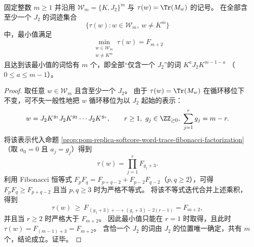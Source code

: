 \begin{corollary}[词迹底数的最小值与精确重数]\label{cor:pom-replica-softcore-word-trace-minimal-base-multiplicity}
固定整数 \(m\ge 1\) 并沿用 \(\mathcal W_m=\{K,J_2\}^m\) 与 \(\tau(w)=\Tr(M_w)\) 的记号。
在全部含至少一个 \(J_2\) 的词迹集合
\[
\bigl\{\tau(w):w\in\mathcal W_m,\ w\neq K^m\bigr\}
\]
中，最小值满足
\[
\boxed{\ \min_{\substack{w\in\mathcal W_m\\ w\neq K^m}}\tau(w)=F_{m+2}\ }
\]
且达到该最小值的词恰有 \(m\) 个，即全部“仅含一个 \(J_2\)”的词
\(
K^{a}J_2K^{m-1-a}
\)
（\(0\le a\le m-1\)）。
\end{corollary}
\begin{proof}
取任意 \(w\in\mathcal W_m\) 且含至少一个 \(J_2\)。
由于 \(\tau(w)=\Tr(M_w)\) 在循环移位下不变，可不失一般性地把 \(w\) 循环移位为以 \(J_2\) 起始的表示：
\[
w=J_2K^{g_1}J_2K^{g_2}\cdots J_2K^{g_r},
\qquad r\ge 1,\ g_j\in\ZZ_{\ge 0},\ \sum_{j=1}^{r}g_j=m-r.
\]
将该表示代入命题 \ref{prop:pom-replica-softcore-word-trace-fibonacci-factorization}（取 \(a_0=0\) 且 \(a_j=g_j\)）得到
\[
\tau(w)=\prod_{j=1}^{r}F_{g_j+3}.
\]
利用 Fibonacci 恒等式 \(F_pF_q=F_{p+q-2}+F_{p-2}F_{q-2}\)（\(p,q\ge 2\)），可得
\(
F_pF_q\ge F_{p+q-2}
\)
且当 \(p,q\ge 3\) 时为严格不等式。
将该不等式迭代合并上述乘积，得到
\[
\tau(w)\ \ge\ F_{\,(g_1+3)+\cdots+(g_r+3)-2(r-1)}=F_{m+2},
\]
并且当 \(r\ge 2\) 时严格大于 \(F_{m+2}\)。
因此最小值只能在 \(r=1\) 时取得，且此时 \(\tau(w)=F_{(m-1)+3}=F_{m+2}\)。
含恰一个 \(J_2\) 的词由 \(J_2\) 的位置唯一确定，共有 \(m\) 个，结论成立。证毕。
\end{proof}

\endinput

